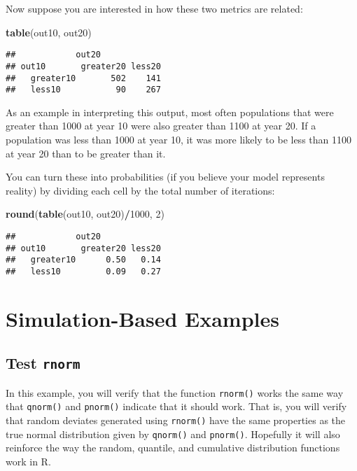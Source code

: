 \documentclass[]{book}
\newenvironment{Shaded}{\begin{snugshade}}{\end{snugshade}}
\newcommand{\KeywordTok}[1]{\textcolor[rgb]{0.13,0.29,0.53}{\textbf{#1}}}
\newcommand{\DecValTok}[1]{\textcolor[rgb]{0.00,0.00,0.81}{#1}}
\newcommand{\OperatorTok}[1]{\textcolor[rgb]{0.81,0.36,0.00}{\textbf{#1}}}
\newcommand{\NormalTok}[1]{#1}
\theoremstyle{definition}
\theoremstyle{definition}
\theoremstyle{definition}
\theoremstyle{remark}
\begin{document}
Now suppose you are interested in how these two metrics are related:

\begin{Shaded}
\begin{Highlighting}[]
\KeywordTok{table}\NormalTok{(out10, out20)}
\end{Highlighting}
\end{Shaded}

\begin{verbatim}
##            out20
## out10       greater20 less20
##   greater10       502    141
##   less10           90    267
\end{verbatim}

As an example in interpreting this output, most often populations that
were greater than 1000 at year 10 were also greater than 1100 at year
20. If a population was less than 1000 at year 10, it was more likely to
be less than 1100 at year 20 than to be greater than it.

You can turn these into probabilities (if you believe your model
represents reality) by dividing each cell by the total number of
iterations:

\begin{Shaded}
\begin{Highlighting}[]
\KeywordTok{round}\NormalTok{(}\KeywordTok{table}\NormalTok{(out10, out20)}\OperatorTok{/}\DecValTok{1000}\NormalTok{, }\DecValTok{2}\NormalTok{)}
\end{Highlighting}
\end{Shaded}

\begin{verbatim}
##            out20
## out10       greater20 less20
##   greater10      0.50   0.14
##   less10         0.09   0.27
\end{verbatim}

\section{Simulation-Based Examples}\label{sim-examples}

\subsection{\texorpdfstring{Test
\texttt{rnorm}}{Test rnorm}}\label{rnorm-ex}

In this example, you will verify that the function \texttt{rnorm()}
works the same way that \texttt{qnorm()} and \texttt{pnorm()} indicate
that it should work. That is, you will verify that random deviates
generated using \texttt{rnorm()} have the same properties as the true
normal distribution given by \texttt{qnorm()} and \texttt{pnorm()}.
Hopefully it will also reinforce the way the random, quantile, and
cumulative distribution functions work in R.
\end{document}
